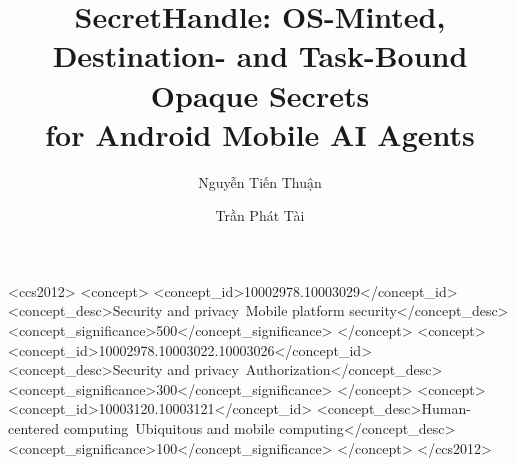 \documentclass[sigconf,10pt]{acmart}
\theoremstyle{acmplain}%
\begin{document}
\title[SecretHandle]{SecretHandle: OS-Minted, Destination- and Task-Bound Opaque Secrets\\ for Android Mobile AI Agents}

\author{Nguyễn Tiến Thuận}

\author{Trần Phát Tài}

\renewcommand{\shortauthors}{Nguyễn and Trần}

\begin{abstract}

\end{abstract}

\begin{CCSXML}
<ccs2012>
   <concept>
       <concept_id>10002978.10003029</concept_id>
       <concept_desc>Security and privacy~Mobile platform security</concept_desc>
       <concept_significance>500</concept_significance>
   </concept>
   <concept>
       <concept_id>10002978.10003022.10003026</concept_id>
       <concept_desc>Security and privacy~Authorization</concept_desc>
       <concept_significance>300</concept_significance>
   </concept>
   <concept>
       <concept_id>10003120.10003121</concept_id>
       <concept_desc>Human-centered computing~Ubiquitous and mobile computing</concept_desc>
       <concept_significance>100</concept_significance>
   </concept>
</ccs2012>
\end{CCSXML}



\maketitle













\clearpage



\appendix

\end{document}
